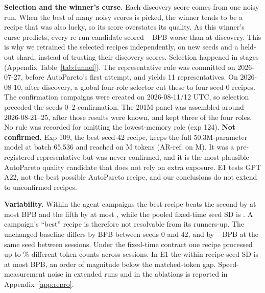 \documentclass{article}
\newif\ifshowhumanmarkers \showhumanmarkersfalse
\newcommand{\humantag}[1]{{\color{humanframe}\sffamily\scriptsize\bfseries HUMAN AUTHOR MUST REWRITE/VERIFY [#1]}\ }
\newcommand{\humanauthor}[2][]{\ifshowhumanmarkers\begin{humanbox}\humantag{#1}#2\end{humanbox}\else #2\par\fi}
\begin{document}
\humanauthor[P2-09 r6]{\textbf{Selection and the winner's curse.} Each discovery score comes from one noisy run. When the best of many noisy scores is picked, the winner tends to be a recipe that was also lucky, so its score overstates its quality. As this winner's curse predicts, every re-run candidate scored \CROptMin--\CROptMax{} BPB worse than at discovery. This is why we retrained the selected recipes independently, on new seeds and a held-out shard, instead of trusting their discovery scores. Selection happened in stages (Appendix Table~\ref{tab:funnel}). The representative rule was committed on 2026-07-27, before AutoPareto's first attempt, and yields 11 representatives. On 2026-08-10, after discovery, a global four-role selector cut these to four seed-0 recipes. The confirmation campaigns were created on 2026-08-11/12 UTC, so selection preceded the seeds-0--2 confirmation. The 201M panel was assembled around 2026-08-21--25, after those results were known, and kept three of the four roles. No rule was recorded for omitting the lowest-memory role (exp 124). \textbf{Not confirmed.} Exp 109, the best seed-42 recipe, keeps the full 50.3M-parameter model at batch 65,536 and reached \CRExpOneZeroNineBPB{} on \CRExpOneZeroNineTokens M tokens (AR-ref: \CRSeedFortyTwoAR{} on \CRExpSixEightTokens M). It was a pre-registered representative but was never confirmed, and it is the most plausible AutoPareto quality candidate that does not rely on extra exposure. E1 tests GPT A22, not the best possible AutoPareto recipe, and our conclusions do not extend to unconfirmed recipes.}

\humanauthor[P2-10 r6]{\textbf{Variability.} Within the agent campaigns the best recipe beats the second by at most \CRGapTwoMax{} BPB and the fifth by at most \CRGapFiveMax, while the pooled fixed-time seed SD is \CRPooledSD. A campaign's ``best'' recipe is therefore not resolvable from its runners-up. The unchanged baseline differs by \CRBaseSeedEffect{} BPB between seeds 0 and 42, and by \CRSessionLo--\CRSessionHi{} BPB at the same seed between sessions. Under the fixed-time contract one recipe processed up to \CRTokenSpreadMax\% different token counts across sessions. In E1 the within-recipe seed SD is at most \CREOneMaxSD{} BPB, an order of magnitude below the matched-token gap. Speed-measurement noise in extended runs and in the ablations is reported in Appendix~\ref{app:repro}.}
\end{document}

